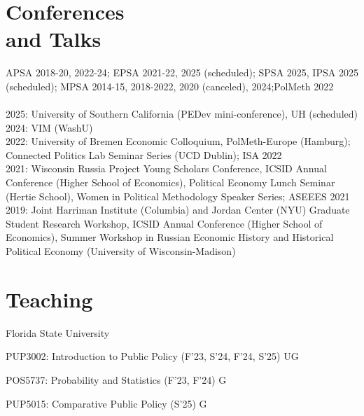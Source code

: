 \documentclass[margin,line,10.95pt]{res}
\newenvironment{list1}{
  \begin{list}{\ding{113}}{%
      \setlength{\itemsep}{0in}
      \setlength{\parsep}{0in} \setlength{\parskip}{0in}
      \setlength{\topsep}{0in} \setlength{\partopsep}{0in}
      \setlength{\leftmargin}{0.17in}}}{\end{list}}
\begin{document}
\begin{resume}
\section{\sc Conferences \\ and Talks}

APSA 2018-20, 2022-24; EPSA 2021-22, 2025 (scheduled); SPSA 2025, IPSA 2025 (scheduled); MPSA 2014-15, 2018-2022, 2020 (canceled), 2024;PolMeth 2022
\\
\\
2025: University of Southern California (PEDev mini-conference), UH (scheduled)\\
2024: VIM (WashU) \\
2022: University of Bremen Economic Colloquium, PolMeth-Europe (Hamburg); Connected Politics Lab Seminar Series (UCD Dublin); ISA 2022
\\
2021: Wisconsin Russia Project Young Scholars Conference, ICSID Annual Conference (Higher School of Economics), Political Economy Lunch Seminar (Hertie School), Women in Political Methodology Speaker Series; ASEEES 2021
\\
2019: Joint Harriman Institute (Columbia) and Jordan Center (NYU) Graduate Student Research Workshop,  ICSID Annual Conference (Higher School of Economics), Summer Workshop in Russian Economic History and Historical Political Economy (University of Wisconsin-Madison) 


\section{\sc Teaching }

{Florida State University}\\
\vspace*{-.1in}
\begin{list1}
\item[] PUP3002: Introduction to Public Policy (F'23, S'24, F'24, S'25) UG
\item[] POS5737: Probability and Statistics (F'23, F'24) G
\item[] PUP5015: Comparative Public Policy (S'25) G
\end{list1}





\end{resume}
\end{document}
